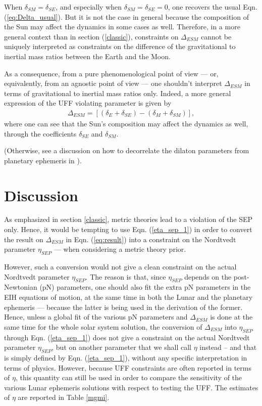 \documentclass[fleqn,usenatbib,referee]{mnras}
\begin{document}
When $\delta_{SM}=\delta_{SE}$, and especially when $\delta_{SM}=\delta_{SE}=0$, one recovers the usual Eqn. (\ref{eq:Delta_usual}). But it is not the case in general because the composition of the Sun may affect the dynamics in some cases as well. Therefore, in a more general context than in section (\ref{classic}), constraints on $\Delta_{ESM}$ cannot be uniquely interpreted as constraints on the difference of the gravitational to inertial mass ratios between the Earth and the Moon. 

As a consequence, from a pure phenomenological point of view --- or, equivalently, from an agnostic point of view --- one shouldn't interpret $\Delta_{ESM}$ in terms of gravitational to inertial mass ratios only. Indeed, a more general expression of the UFF violating parameter is given by
\begin{eqnarray}
\Delta_{ESM} =\left[(\delta_E+\delta_{SE})- (\delta_M+\delta_{SM}) \right],\label{eq:Delta_dilaton}
\end{eqnarray}
where one can see that the Sun's composition may affect the dynamics as well, through the coefficients $\delta_{SE}$ and $\delta_{SM}$. 

(Otherwise, see a discussion on how to decorrelate the dilaton parameters from planetary ephemeris in \cite[]{2017arXiv170505244M}).

\section{Discussion}
\label{sec:discu}

As emphasized in section \ref{classic}, metric theories lead to a violation of the SEP only. Hence, it would be tempting to use Eqn. (\ref{eta_sep_1}) in order to convert the result on $\Delta_{ESM}$ in Eqn. (\ref{eq:result}) into a constraint on the Nordtvedt parameter $\eta_{SEP}$ --- when considering a metric theory prior.

However, such a conversion would not give a clean constraint on the actual Nordtvedt parameter $\eta_{SEP}$. The reason is that, since $\eta_{SEP}$ depends on the post-Newtonian (pN) parameters, one should also fit the extra pN parameters in the EIH equations of motion, at the same time in both the Lunar and the planetary ephemeris --- because the latter is being used in the derivation of the former. Hence, unless a global fit of the various pN parameters and $\Delta_{ESM}$ is done at the same time for the whole solar system solution, the conversion of $\Delta_{ESM}$ into $\eta_{SEP}$ through Eqn. (\ref{eta_sep_1}) does not give a constraint on the actual Nordtvedt parameter $\eta_{SEP}$, but on another parameter that we shall call $\eta$ instead -- and that is simply defined by Eqn. (\ref{eta_sep_1}), without any specific interpretation in terms of physics. However, because UFF constraints are often reported in terms of $\eta$, this quantity can still be used in order to compare the sensitivity of the various Lunar ephemeris solutions with respect to testing the UFF. The estimates of $\eta$ are reported in Table \ref{mgmi}.
\end{document}
